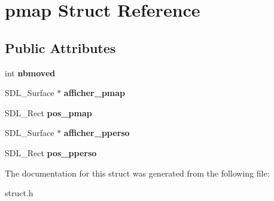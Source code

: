 \hypertarget{structpmap}{}\section{pmap Struct Reference}
\label{structpmap}
\subsection*{Public Attributes}
\begin{DoxyCompactItemize}
\item 
\mbox{\label{structpmap_a70b813baa5dd1ba32e676491019f344c}} 
int {\bfseries nbmoved}
\item 
\mbox{\label{structpmap_a4fd1750570590001528322da168bbf8e}} 
S\+D\+L\+\_\+\+Surface $\ast$ {\bfseries afficher\+\_\+pmap}
\item 
\mbox{\label{structpmap_a1ec871d94c7648f3f1dc49e9cd3146d5}} 
S\+D\+L\+\_\+\+Rect {\bfseries pos\+\_\+pmap}
\item 
\mbox{\label{structpmap_a8c940484d97587e6c202433f7c2d5673}} 
S\+D\+L\+\_\+\+Surface $\ast$ {\bfseries afficher\+\_\+pperso}
\item 
\mbox{\label{structpmap_a6534b3c60d544631809c86d76450b592}} 
S\+D\+L\+\_\+\+Rect {\bfseries pos\+\_\+pperso}
\end{DoxyCompactItemize}


The documentation for this struct was generated from the following file\+:\begin{DoxyCompactItemize}
\item 
struct.\+h\end{DoxyCompactItemize}
